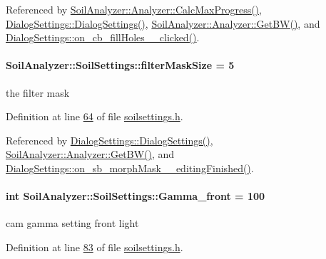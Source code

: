 Referenced by \hyperlink{analyzer_8cpp_source_l00112}{Soil\+Analyzer\+::\+Analyzer\+::\+Calc\+Max\+Progress()}, \hyperlink{dialogsettings_8cpp_source_l00005}{Dialog\+Settings\+::\+Dialog\+Settings()}, \hyperlink{analyzer_8cpp_source_l00236}{Soil\+Analyzer\+::\+Analyzer\+::\+Get\+B\+W()}, and \hyperlink{dialogsettings_8cpp_source_l00393}{Dialog\+Settings\+::on\+\_\+cb\+\_\+fill\+Holes\+\_\+\_\+clicked()}.

\hypertarget{class_soil_analyzer_1_1_soil_settings_ad9d5071bbf6d10638df024e883c6199f}{}
\paragraph[{filter\+Mask\+Size}]{ Soil\+Analyzer\+::\+Soil\+Settings\+::filter\+Mask\+Size = 5}\label{class_soil_analyzer_1_1_soil_settings_ad9d5071bbf6d10638df024e883c6199f}
the filter mask 

Definition at line \hyperlink{soilsettings_8h_source_l00064}{64} of file \hyperlink{soilsettings_8h_source}{soilsettings.\+h}.



Referenced by \hyperlink{dialogsettings_8cpp_source_l00005}{Dialog\+Settings\+::\+Dialog\+Settings()}, \hyperlink{analyzer_8cpp_source_l00236}{Soil\+Analyzer\+::\+Analyzer\+::\+Get\+B\+W()}, and \hyperlink{dialogsettings_8cpp_source_l00417}{Dialog\+Settings\+::on\+\_\+sb\+\_\+morph\+Mask\+\_\+\_\+editing\+Finished()}.

\hypertarget{class_soil_analyzer_1_1_soil_settings_adee4687a4c0637a04b49d70ad7d45dc4}{}
\paragraph[{Gamma\+\_\+front}]{\setlength{\rightskip}{0pt plus 5cm}int Soil\+Analyzer\+::\+Soil\+Settings\+::\+Gamma\+\_\+front = 100}\label{class_soil_analyzer_1_1_soil_settings_adee4687a4c0637a04b49d70ad7d45dc4}
cam gamma setting front light 

Definition at line \hyperlink{soilsettings_8h_source_l00083}{83} of file \hyperlink{soilsettings_8h_source}{soilsettings.\+h}.

